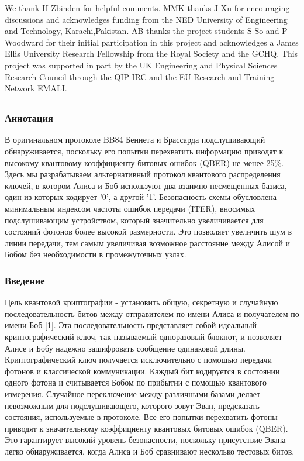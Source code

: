 We thank H Zbinden for helpful comments. MMK thanks J Xu for encouraging discussions and acknowledges funding from the NED University of Engineering and Technology, Karachi,Pakistan. AB thanks the project students S So and P Woodward for their initial participation in this project and acknowledges a James Ellis University Research Fellowship from the Royal Society and the GCHQ. This project was supported in part by the UK Engineering and Physical Sciences Research Council through the QIP IRC and the EU Research and Training Network EMALI.

\subsection{\trnas}
\subsubsection*{Аннотация}

В оригинальном протоколе BB84 Беннета и Брассарда подслушивающий обнаруживается, поскольку его попытки перехватить информацию приводят к высокому квантовому коэффициенту битовых ошибок (QBER) не менее 25\%. Здесь мы разрабатываем альтернативный протокол квантового распределения ключей, в котором Алиса и Боб используют два взаимно несмещенных базиса, один из которых кодирует '0', а другой '1'. Безопасность схемы обусловлена минимальным индексом частоты ошибок передачи (ITER), вносимых подслушивающим устройством, который значительно увеличивается для состояний фотонов более высокой размерности. Это позволяет увеличить шум в линии передачи, тем самым увеличивая возможное расстояние между Алисой и Бобом без необходимости в промежуточных узлах.

\subsubsection{Введение}

Цель квантовой криптографии - установить общую, секретную и случайную последовательность битов между отправителем по имени Алиса и получателем по имени Боб [1]. Эта последовательность представляет собой идеальный криптографический ключ, так называемый одноразовый блокнот, и позволяет Алисе и Бобу надежно зашифровать сообщение одинаковой длины. Криптографический ключ получается исключительно с помощью передачи фотонов и классической коммуникации. Каждый бит кодируется в состоянии одного фотона и считывается Бобом по прибытии с помощью квантового измерения. Случайное переключение между различными базами делает невозможным для подслушивающего, которого зовут Эван, предсказать состояния, используемые в протоколе. Все его попытки перехватить фотоны приводят к значительному коэффициенту квантовых битовых ошибок (QBER). Это гарантирует высокий уровень безопасности, поскольку присутствие Эвана легко обнаруживается, когда Алиса и Боб сравнивают несколько тестовых битов.

